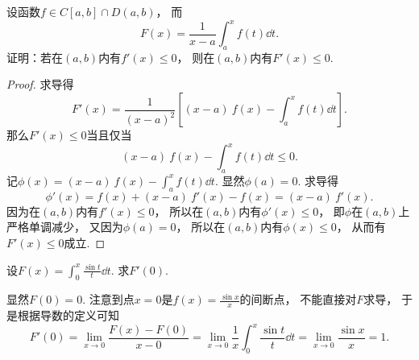 \begin{example}
设函数\(f \in C[a,b] \cap D(a,b)\)，
而\begin{equation*}
	F(x) = \frac1{x-a} \int_a^x f(t) \dd{t}.
\end{equation*}
证明：若在\((a,b)\)内有\(f'(x) \leq 0\)，
则在\((a,b)\)内有\(F'(x) \leq 0\).
\begin{proof}
求导得\begin{equation*}
	F'(x) = \frac1{(x-a)^2} \left[ (x-a)~f(x) - \int_a^x f(t) \dd{t} \right].
\end{equation*}
那么\(F'(x) \leq 0\)当且仅当\begin{equation*}
	(x-a)~f(x) - \int_a^x f(t) \dd{t} \leq 0.
\end{equation*}
记\(\phi(x) = (x-a)~f(x) - \int_a^x f(t) \dd{t}\).
显然\(\phi(a) = 0\).
求导得\begin{equation*}
	\phi'(x) = f(x) + (x-a)~f'(x) - f(x)
	= (x-a)~f'(x).
\end{equation*}
因为在\((a,b)\)内有\(f'(x) \leq 0\)，
所以在\((a,b)\)内有\(\phi'(x) \leq 0\)，
即\(\phi\)在\((a,b)\)上严格单调减少，
又因为\(\phi(a) = 0\)，
所以在\((a,b)\)内有\(\phi(x) \leq 0\)，
从而有\(F'(x) \leq 0\)成立.
\end{proof}
\end{example}
\begin{example}
设\(F(x) = \int_0^x \frac{\sin t}{t} \dd{t}\).
求\(F'(0)\).
\begin{solution}
显然\(F(0) = 0\).
注意到点\(x=0\)是\(f(x) = \frac{\sin x}{x}\)的间断点，
不能直接对\(F\)求导，
于是根据导数的定义可知\begin{equation*}
	F'(0) = \lim_{x\to0} \frac{F(x)-F(0)}{x-0}
	= \lim_{x\to0} \frac1x \int_0^x \frac{\sin t}{t} \dd{t}
	= \lim_{x\to0} \frac{\sin x}{x}
	= 1.
\end{equation*}
\end{solution}
\end{example}

